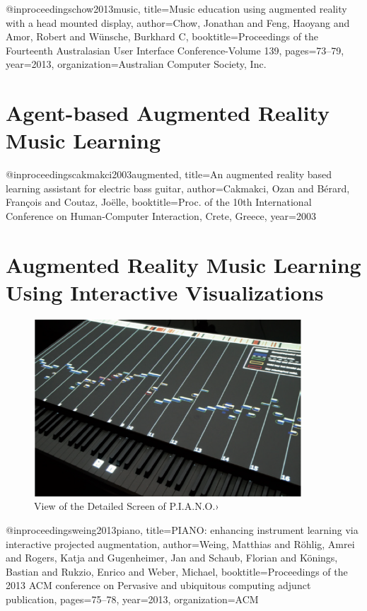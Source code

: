 \documentclass{article}
\begin{document}
@inproceedings{chow2013music,
  title={Music education using augmented reality with a head mounted display},
  author={Chow, Jonathan and Feng, Haoyang and Amor, Robert and W{\"u}nsche, Burkhard C},
  booktitle={Proceedings of the Fourteenth Australasian User Interface Conference-Volume 139},
  pages={73--79},
  year={2013},
  organization={Australian Computer Society, Inc.}
}

\section{Agent-based Augmented Reality Music Learning}

@inproceedings{cakmakci2003augmented,
  title={An augmented reality based learning assistant for electric bass guitar},
  author={Cakmakci, Ozan and B{\'e}rard, Fran{\c{c}}ois and Coutaz, Jo{\"e}lle},
  booktitle={Proc. of the 10th International Conference on Human-Computer Interaction, Crete, Greece},
  year={2003}
}

\section{Augmented Reality Music Learning Using Interactive Visualizations}

\begin{figure}
    \centering
    \includegraphics[width=10cm]{figures/piano}
    \caption{View of the Detailed Screen of P.I.A.N.O.› }
    \label{fig:View from the HeadMounted}
\end{figure}


@inproceedings{weing2013piano,
  title={PIANO: enhancing instrument learning via interactive projected augmentation},
  author={Weing, Matthias and R{\"o}hlig, Amrei and Rogers, Katja and Gugenheimer, Jan and Schaub, Florian and K{\"o}nings, Bastian and Rukzio, Enrico and Weber, Michael},
  booktitle={Proceedings of the 2013 ACM conference on Pervasive and ubiquitous computing adjunct publication},
  pages={75--78},
  year={2013},
  organization={ACM}
}
\end{document}
